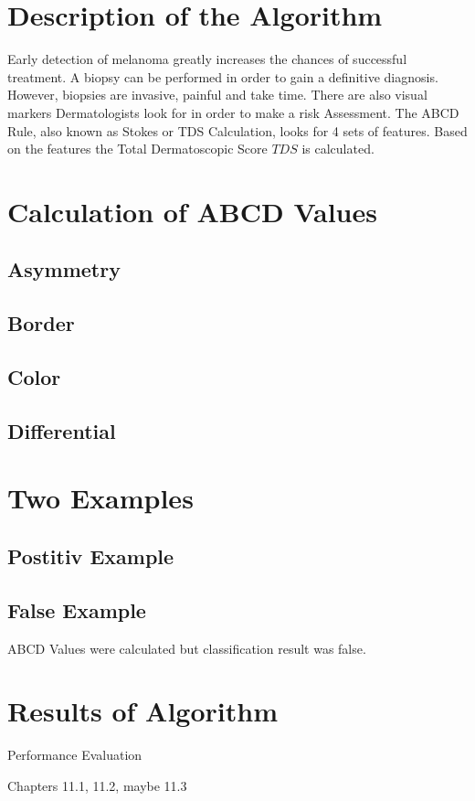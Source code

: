 \section{Description of the Algorithm}

Early detection of melanoma greatly increases the chances of successful treatment. A biopsy can be performed in order to gain a definitive diagnosis. However, biopsies are invasive, painful and take time. There are also visual markers Dermatologists look for in order to make a risk Assessment. The ABCD Rule, also known as Stokes or TDS Calculation, looks for 4 sets of features. Based on the features the Total Dermatoscopic Score \(TDS\) is calculated.

\section{Calculation of ABCD Values}
\subsection{Asymmetry}
\subsection{Border}
\subsection{Color}
\subsection{Differential}

\section{Two Examples}
\subsection{Postitiv Example}

\subsection{False Example}

ABCD Values were calculated but classification result was false.

\section{Results of Algorithm}

Performance Evaluation

Chapters 11.1, 11.2, maybe 11.3